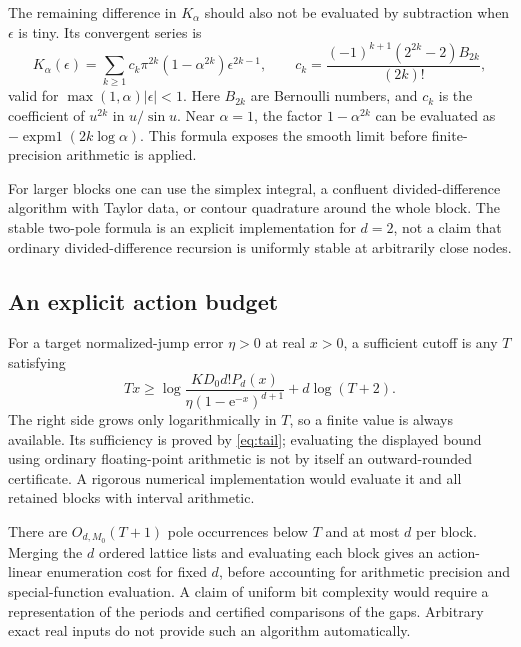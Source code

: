 \documentclass[11pt,a4paper]{article}
\numberwithin{equation}{section}
\theoremstyle{definition}
\theoremstyle{remark}
\newcommand{\e}{\mathrm e}
\begin{document}
The remaining difference in $K_\alpha$ should also not be evaluated by
subtraction when $\epsilon$ is tiny. Its convergent series is
\begin{equation}
 K_\alpha(\epsilon)=\sum_{k\ge1}
 c_k\pi^{2k}(1-\alpha^{2k})\epsilon^{2k-1},\qquad
 c_k=\frac{(-1)^{k+1}(2^{2k}-2)B_{2k}}{(2k)!},
 \label{eq:Kseries}
\end{equation}
valid for $\max(1,\alpha)|\epsilon|<1$. Here $B_{2k}$ are Bernoulli
numbers, and $c_k$ is the coefficient of $u^{2k}$ in $u/\sin u$.
Near $\alpha=1$, the factor $1-\alpha^{2k}$ can be evaluated as
$-\operatorname{expm1}(2k\log\alpha)$. This formula exposes the smooth
limit before finite-precision arithmetic is applied.

For larger blocks one can use the simplex integral, a confluent
divided-difference algorithm with Taylor data, or contour quadrature
around the whole block. The stable two-pole formula is an explicit
implementation for $d=2$, not a claim that ordinary divided-difference
recursion is uniformly stable at arbitrarily close nodes.

\subsection{An explicit action budget}
For a target normalized-jump error $\eta>0$ at real $x>0$, a sufficient
cutoff is any $T$ satisfying
\begin{equation}
 Tx\ge\log\frac{KD_0d!P_d(x)}{\eta(1-\e^{-x})^{d+1}}
                +d\log(T+2).
 \label{eq:budget}
\end{equation}
The right side grows only logarithmically in $T$, so a finite value is
always available. Its sufficiency is proved by \eqref{eq:tail}; evaluating
the displayed bound using ordinary floating-point arithmetic is not by
itself an outward-rounded certificate. A rigorous numerical implementation
would evaluate it and all retained blocks with interval arithmetic.

There are $O_{d,M_0}(T+1)$ pole occurrences below $T$ and at most $d$ per
block. Merging the $d$ ordered lattice lists and evaluating each block
gives an action-linear enumeration cost for fixed $d$, before accounting
for arithmetic precision and special-function evaluation. A claim of
uniform bit complexity would require a representation of the periods and
certified comparisons of the gaps. Arbitrary exact real inputs do not
provide such an algorithm automatically.
\end{document}
